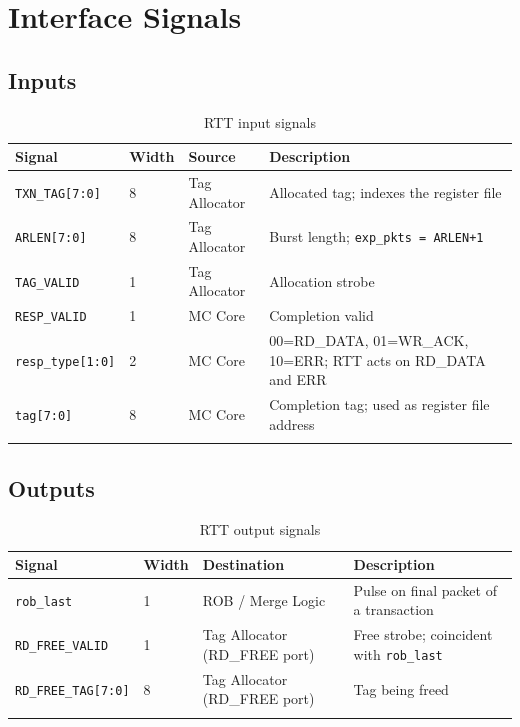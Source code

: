 \documentclass[11pt,a4paper]{article}
\begin{document}
\section{Interface Signals}

\subsection{Inputs}

\begin{longtable}{p{3cm}p{1cm}p{3cm}p{7cm}}
\toprule
\textbf{Signal} & \textbf{Width} & \textbf{Source} & \textbf{Description} \\
\midrule
\texttt{TXN\_TAG[7:0]}    & 8 & Tag Allocator & Allocated tag; indexes the register file \\
\texttt{ARLEN[7:0]}       & 8 & Tag Allocator & Burst length; \texttt{exp\_pkts = ARLEN+1} \\
\texttt{TAG\_VALID}       & 1 & Tag Allocator & Allocation strobe \\
\texttt{RESP\_VALID}      & 1 & MC Core       & Completion valid \\
\texttt{resp\_type[1:0]}  & 2 & MC Core       & 00=RD\_DATA, 01=WR\_ACK, 10=ERR; RTT acts on RD\_DATA and ERR \\
\texttt{tag[7:0]}         & 8 & MC Core       & Completion tag; used as register file address \\
\bottomrule
\caption{RTT input signals}
\end{longtable}

\subsection{Outputs}

\begin{longtable}{p{3cm}p{1cm}p{3cm}p{7cm}}
\toprule
\textbf{Signal} & \textbf{Width} & \textbf{Destination} & \textbf{Description} \\
\midrule
\texttt{rob\_last}          & 1 & ROB / Merge Logic             & Pulse on final packet of a transaction \\
\texttt{RD\_FREE\_VALID}    & 1 & Tag Allocator (RD\_FREE port) & Free strobe; coincident with \texttt{rob\_last} \\
\texttt{RD\_FREE\_TAG[7:0]} & 8 & Tag Allocator (RD\_FREE port) & Tag being freed \\
\bottomrule
\caption{RTT output signals}
\end{longtable}
\end{document}
